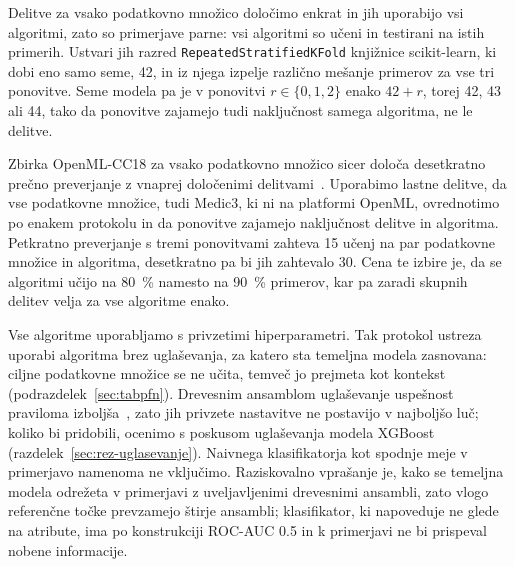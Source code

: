 \documentclass[a4paper,12pt,openright]{book}
\begin{document}
Delitve za vsako podatkovno množico določimo enkrat in jih uporabijo vsi
algoritmi, zato so primerjave parne: vsi algoritmi so učeni in testirani na
istih primerih. Ustvari jih razred \texttt{RepeatedStratifiedKFold} knjižnice
scikit-learn, ki dobi eno samo seme, 42, in iz njega izpelje različno mešanje
primerov za vse tri ponovitve. Seme modela pa je v ponovitvi
$r \in \{0, 1, 2\}$ enako $42 + r$, torej 42, 43 ali 44, tako da ponovitve
zajamejo tudi naključnost samega algoritma, ne le delitve.

Zbirka OpenML-CC18 za vsako podatkovno množico sicer določa desetkratno
prečno preverjanje z vnaprej določenimi
delitvami~\cite{bischl2021openml}. Uporabimo lastne delitve, da vse podatkovne
množice, tudi Medic3, ki ni na platformi OpenML, ovrednotimo po enakem
protokolu in da ponovitve zajamejo naključnost delitve in algoritma. Petkratno
preverjanje s tremi ponovitvami zahteva 15 učenj na par podatkovne množice in
algoritma, desetkratno pa bi jih zahtevalo 30. Cena te izbire je, da se
algoritmi učijo na \SI{80}{\percent} namesto na \SI{90}{\percent} primerov,
kar pa zaradi skupnih delitev velja za vse algoritme enako.

Vse algoritme uporabljamo s privzetimi hiperparametri. Tak protokol ustreza
uporabi algoritma brez uglaševanja, za katero sta temeljna modela zasnovana:
ciljne podatkovne množice se ne učita, temveč jo prejmeta kot kontekst
(podrazdelek~\ref{sec:tabpfn}). Drevesnim ansamblom uglaševanje uspešnost
praviloma izboljša~\cite{probst2019tunability}, zato jih privzete nastavitve ne
postavijo v najboljšo luč; koliko bi pridobili, ocenimo s poskusom uglaševanja
modela XGBoost (razdelek~\ref{sec:rez-uglasevanje}). Naivnega klasifikatorja
kot spodnje meje v primerjavo namenoma ne vključimo. Raziskovalno vprašanje je,
kako se temeljna modela odrežeta v primerjavi z uveljavljenimi drevesnimi
ansambli, zato vlogo referenčne točke prevzamejo štirje ansambli; klasifikator,
ki napoveduje ne glede na atribute, ima po konstrukciji ROC-AUC \num{0.5} in k
primerjavi ne bi prispeval nobene informacije.
\end{document}
